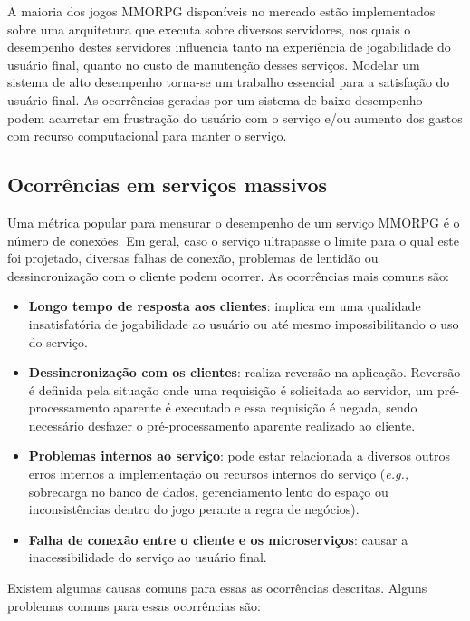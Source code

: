 A maioria dos jogos \ac{MMORPG} disponíveis no mercado estão implementados sobre uma arquitetura que executa sobre diversos servidores, nos quais o desempenho destes servidores influencia tanto na experiência de jogabilidade do usuário final, quanto no custo de manutenção desses serviços.
%
Modelar um sistema de alto desempenho torna-se um trabalho essencial para a satisfação do usuário final\cite{1417630}.
%
As ocorrências geradas por um sistema de baixo desempenho podem acarretar em frustração do usuário com o serviço e/ou aumento dos gastos com recurso computacional para manter o serviço.


\subsection{Ocorrências em serviços massivos}
\label{sec:ocorrencias}

Uma métrica popular para mensurar o desempenho de um serviço \ac{MMORPG} é o número de conexões\cite{1417630}.
%
Em geral, caso o serviço ultrapasse o limite para o qual este foi projetado, diversas falhas de conexão, problemas de lentidão ou dessincronização com o cliente podem ocorrer.
%
As ocorrências mais comuns são\cite{1417630}:

\begin{itemize}
  \item \textbf{Longo tempo de resposta aos clientes}: implica em uma qualidade insatisfatória de jogabilidade ao usuário ou até mesmo impossibilitando o uso do serviço.
  \item \textbf{Dessincronização com os clientes}: realiza reversão na aplicação. Reversão é definida pela situação onde uma requisição é solicitada ao servidor, um pré-processamento aparente é executado e essa requisição é negada, sendo necessário desfazer o pré-processamento aparente realizado ao cliente.
  \item \textbf{Problemas internos ao serviço}:  pode estar relacionada a diversos outros erros internos a implementação ou recursos internos do serviço (\textit{e.g.,} sobrecarga no banco de dados, gerenciamento lento do espaço ou inconsistências dentro do jogo perante a regra de negócios).
  \item \textbf{Falha de conexão entre o cliente e os microserviços}: causar a inacessibilidade do serviço ao usuário final.
\end{itemize}

Existem algumas causas comuns para essas as ocorrências descritas.
%
Alguns problemas comuns para essas ocorrências são\cite{1417630}:

